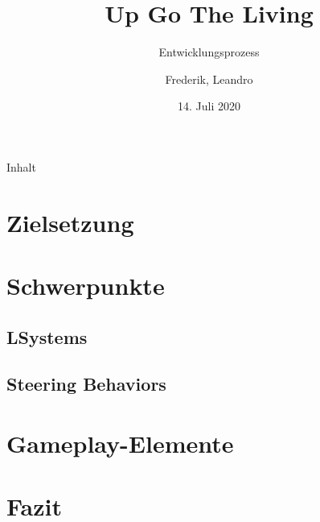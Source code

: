 \documentclass{beamer}
\title{Up Go The Living}
\subtitle{Entwicklungsprozess}
\author{Frederik, Leandro}
\institute{TU Dortmund}
\date{14. Juli 2020}
\begin{document}
\begin{frame}
\titlepage
\end{frame}

\begin{frame}{Inhalt}
\tableofcontents
\end{frame}

\section{Zielsetzung}


\section{Schwerpunkte}

\subsection{LSystems}


\subsection{Steering Behaviors}


\section{Gameplay-Elemente}


\section{Fazit}

\end{document}
